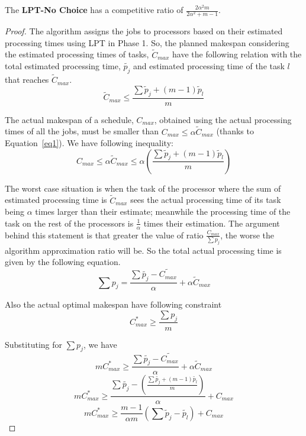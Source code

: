 \begin{theorem}
\label{th:strat1-ub}
The \textbf{LPT-No Choice} has a competitive ratio of $ \frac{2\alpha^{2}m}{2\alpha^{2}+ m-1}$.
\end{theorem} 

\begin{proof}
  The algorithm assigns the jobs to processors based on their
  estimated processing times using LPT in Phase 1. So, the
  planned makespan considering the estimated processing times of tasks,
  $\tilde{C}_{max}$ have the following relation with the total
  estimated processing time, $\tilde{p_j}$ and estimated processing
  time of the task  $l$ that reaches $\tilde{C}_{max}$.
\begin{equation}\label{eq2}
\tilde C_{max}\leq  \frac{\sum{\tilde p_j + (m-1) \tilde p_l} }{m}
\end{equation}

The actual makespan of a schedule, $C_{max}$, obtained using the
actual processing times of all the jobs, must be smaller than $C_{max} \leq \alpha
\tilde C_{max}$ (thanks to Equation~\ref{eq1}). We
have following inequality:
\begin{equation}\label{eq3}
  C_{max}\leq \alpha \tilde C_{max}\leq \alpha \left ( \frac{\sum{\tilde p_j + (m-1) \tilde p_l} }{m} \right )
\end{equation} 

The worst case situation is when the task of the processor where the
sum of estimated processing time is $\tilde C_{max}$ sees the actual
processing time of its task being $\alpha$ times larger than their
estimate; meanwhile the processing time of the task on the rest of the
processors is $\frac{1}{\alpha}$ times their estimation. The argument
behind this statement is that greater the value of ratio
$\frac{C_{max}}{\sum{p_j}}$, the worse the algorithm approximation
ratio will be. So the total actual processing time is
given by the following equation.
 \begin{equation}\label{eq4}
 \sum {p_j} = \frac{\sum \tilde{p_j}- \tilde{C_{max}}}{\alpha} + \alpha \tilde C_{max}
 \end{equation}
 
 Also the actual optimal makespan have following constraint
 \begin{equation}\nonumber 
C_{max}^{*}\geq \frac{\sum {p_j}}{m}
\end{equation}

Substituting for  $ \sum {p_j}$, we have
 \begin{equation}\nonumber 
 m C_{max}^{*}\geq \frac{\sum \tilde{p_j}- \tilde{C_{max}}}{\alpha} + \alpha \tilde C_{max}
 \end{equation} 
\begin{equation}\nonumber 
 m C_{max}^{*}\geq \frac{\sum \tilde{p_j} - \left( \frac{\sum{\tilde{p_j} + (m-1) \tilde{p_l} }}{m} \right )} {\alpha} + {C_{max}}
\end{equation}
\begin{equation}\nonumber
 m C_{max}^{*}\geq \frac{m-1}{\alpha m} \left( \sum \tilde p_j - \tilde{p_l} \right) + {C_{max}}
 \end{equation}


\end{proof}
